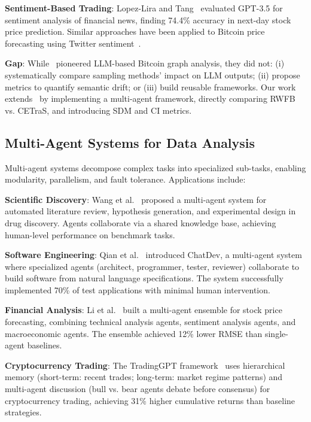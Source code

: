 \textbf{Sentiment-Based Trading}: Lopez-Lira and Tang~\cite{lopezlira2023} evaluated GPT-3.5 for sentiment analysis of financial news, finding 74.4\% accuracy in next-day stock price prediction. Similar approaches have been applied to Bitcoin price forecasting using Twitter sentiment~\cite{valencia2019}.

\textbf{Gap}: While~\cite{lei2025llm} pioneered LLM-based Bitcoin graph analysis, they did not: (i) systematically compare sampling methods' impact on LLM outputs; (ii) propose metrics to quantify semantic drift; or (iii) build reusable frameworks. Our work extends~\cite{lei2025llm} by implementing a multi-agent framework, directly comparing RWFB vs. CETraS, and introducing SDM and CI metrics.

\subsection{Multi-Agent Systems for Data Analysis}

Multi-agent systems decompose complex tasks into specialized sub-tasks, enabling modularity, parallelism, and fault tolerance. Applications include:

\textbf{Scientific Discovery}: Wang et al.~\cite{wang2023scientific} proposed a multi-agent system for automated literature review, hypothesis generation, and experimental design in drug discovery. Agents collaborate via a shared knowledge base, achieving human-level performance on benchmark tasks.

\textbf{Software Engineering}: Qian et al.~\cite{qian2023communicative} introduced ChatDev, a multi-agent system where specialized agents (architect, programmer, tester, reviewer) collaborate to build software from natural language specifications. The system successfully implemented 70\% of test applications with minimal human intervention.

\textbf{Financial Analysis}: Li et al.~\cite{li2024multiagent} built a multi-agent ensemble for stock price forecasting, combining technical analysis agents, sentiment analysis agents, and macroeconomic agents. The ensemble achieved 12\% lower RMSE than single-agent baselines.

\textbf{Cryptocurrency Trading}: The TradingGPT framework~\cite{tradinggpt2024} uses hierarchical memory (short-term: recent trades; long-term: market regime patterns) and multi-agent discussion (bull vs. bear agents debate before consensus) for cryptocurrency trading, achieving 31\% higher cumulative returns than baseline strategies.

